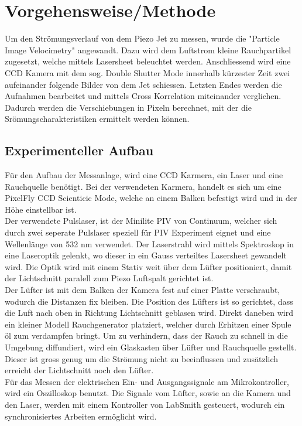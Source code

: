 \chapter{Vorgehensweise/Methode}
Um den Strömungsverlauf von dem Piezo Jet zu messen, wurde die "Particle Image Velocimetry" angewandt. Dazu wird dem Luftstrom kleine Rauchpartikel zugesetzt, welche mittels Lasersheet beleuchtet werden. Anschliessend wird eine CCD Kamera mit dem sog. Double Shutter Mode innerhalb kürzester Zeit zwei aufeinander folgende Bilder von dem Jet schiessen. Letzten Endes werden die Aufnahmen bearbeitet und mittels Cross Korrelation miteinander verglichen. Dadurch werden die Verschiebungen in Pixeln berechnet, mit der die Srömungscharakteristiken ermittelt werden können.
\section{Experimenteller Aufbau}
Für den Aufbau der Messanlage, wird eine CCD Karmera, ein Laser und eine Rauchquelle benötigt. Bei der verwendeten Karmera, handelt es sich um eine PixelFly CCD Scienticic Mode, welche an einem Balken befestigt wird und in der Höhe einstellbar ist.\\
 Der verwendete Pulslaser, ist der Minilite PIV von Continuum, welcher sich durch zwei seperate Pulslaser speziell für PIV Experiment eignet  und eine Wellenlänge von 532 nm verwendet. Der Laserstrahl wird mittels Spektroskop in eine Laseroptik gelenkt, wo dieser in ein Gauss verteiltes Lasersheet gewandelt wird. Die Optik wird mit einem Stativ weit über dem Lüfter positioniert, damit der Lichtschnitt paralell zum Piezo Luftspalt gerichtet ist.\\
 Der Lüfter ist mit dem Balken der Kamera fest auf einer Platte verschraubt, wodurch die Distanzen fix bleiben. Die Position des Lüfters ist so gerichtet, dass die Luft nach oben in Richtung Lichtschnitt geblasen wird. Direkt daneben wird ein kleiner Modell Rauchgenerator platziert, welcher durch Erhitzen einer Spule öl zum verdampfen bringt. Um zu verhindern, dass der Rauch zu schnell in die Umgebung diffundiert, wird ein Glaskasten über Lüfter und Rauchquelle gestellt. Dieser ist gross genug um die Strömung nicht zu beeinflussen und zusätzlich erreicht der Lichtschnitt noch den Lüfter.\\
 Für das Messen der elektrischen Ein- und Ausgangssignale am Mikrokontroller, wird ein Oszilloskop benutzt. Die Signale vom Lüfter, sowie an die Kamera und den Laser, werden mit einem Kontroller von LabSmith gesteuert, wodurch ein synchronisiertes Arbeiten ermöglicht wird.
 
